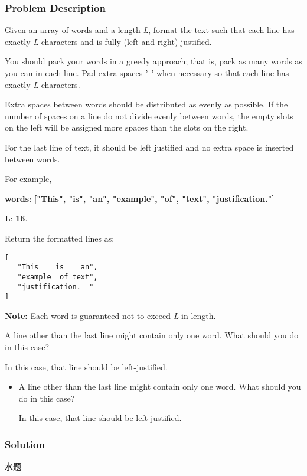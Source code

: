 \documentclass[courier]{article}
\begin{document}
\begin{CJK*}{UTF8}{gkai}
\subsubsection*{Problem Description}
Given an array of words and a length \emph{L}, format the text such that each line has exactly \emph{L} characters and is fully (left and right) justified.

You should pack your words in a greedy approach; that is, pack as many words as you can in each line. Pad extra spaces \textbf{' '} when necessary so that each line has exactly \emph{L} characters.

Extra spaces between words should be distributed as evenly as possible. If the number of spaces on a line do not divide evenly between words, the empty slots on the left will be assigned more spaces than the slots on the right.

For the last line of text, it should be left justified and no extra space is inserted between words.

For example,


\textbf{words}: \textbf{["This", "is", "an", "example", "of", "text", "justification."]}


\textbf{L}: \textbf{16}.

Return the formatted lines as:


\begin{verbatim}
[
   "This    is    an",
   "example  of text",
   "justification.  "
]
\end{verbatim}

\textbf{Note:} Each word is guaranteed not to exceed \emph{L} in length.

A line other than the last line might contain only one word. What should you do in this case?


In this case, that line should be left-justified.
\begin{itemize}
\item A line other than the last line might contain only one word. What should you do in this case?


In this case, that line should be left-justified.
\end{itemize}



\subsubsection*{Solution}
水题


\end{CJK*}
\end{document}

